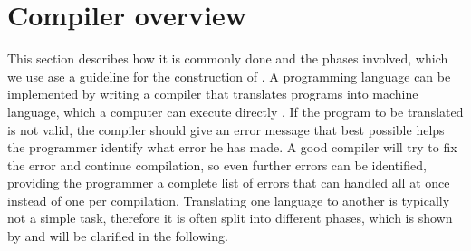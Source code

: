 \section{Compiler overview}
\label{sec:compileroverview}
This section describes how it is commonly done and the phases involved, which we use ase a guideline for the construction of \productname{}.
A programming language can be implemented by writing a compiler that translates programs into machine language, which a computer can execute directly \cite[p. 44]{sebesta2013}.
If the program to be translated is not valid, the compiler should give an error message that best possible helps the programmer identify what error he has made. A good compiler will try to fix the error and continue compilation, so even further errors can be identified, providing the programmer a complete list of errors that can handled all at once instead of one per compilation. Translating one language to another is typically not a simple task, therefore it is often split into different phases, which is shown by  and will be clarified in the following.

\begin{figure}
	\begin{center}
	\end{center}
	\label{fig:compileroverview}
\end{figure}

